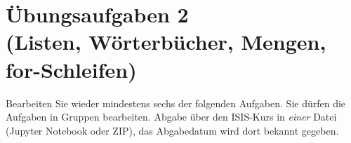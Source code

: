 

\usepackage{paralist}



\section*{Übungsaufgaben 2\\
(Listen, Wörterbücher, Mengen,  for-Schleifen)}



Bearbeiten Sie wieder mindestens sechs der folgenden Aufgaben.
Sie dürfen die Aufgaben in Gruppen bearbeiten. Abgabe über den ISIS-Kurs in {\em einer} Datei (Jupyter Notebook oder ZIP),
das Abgabedatum wird dort bekannt gegeben.

